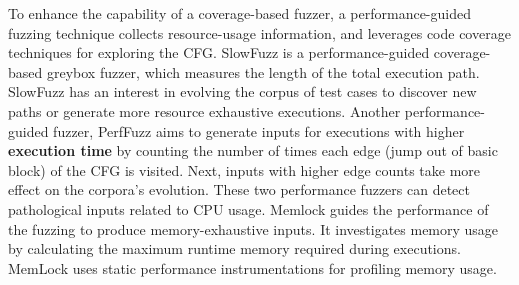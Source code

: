 To enhance the capability of a coverage-based fuzzer, a performance-guided fuzzing technique collects resource-usage information, and leverages code coverage techniques for exploring the CFG. SlowFuzz \cite{petsios2017slowfuzz} is a performance-guided coverage-based greybox fuzzer, which measures the length of the total execution path. SlowFuzz has an interest in evolving the corpus of test cases to discover new paths or generate more resource exhaustive executions. Another performance-guided fuzzer, PerfFuzz \cite{lemieux2018perffuzz} aims to generate inputs for executions with higher \textbf{execution time} by counting the number of times each edge (jump out of basic block) of the CFG is visited. Next, inputs with higher edge counts take more effect on the corpora's evolution. These two performance fuzzers can detect pathological inputs related to CPU usage. Memlock \cite{wen2020memlock} guides the performance of the fuzzing to produce memory-exhaustive inputs. It investigates memory usage by calculating the maximum runtime memory required during executions. MemLock uses static performance instrumentations for profiling memory usage.

